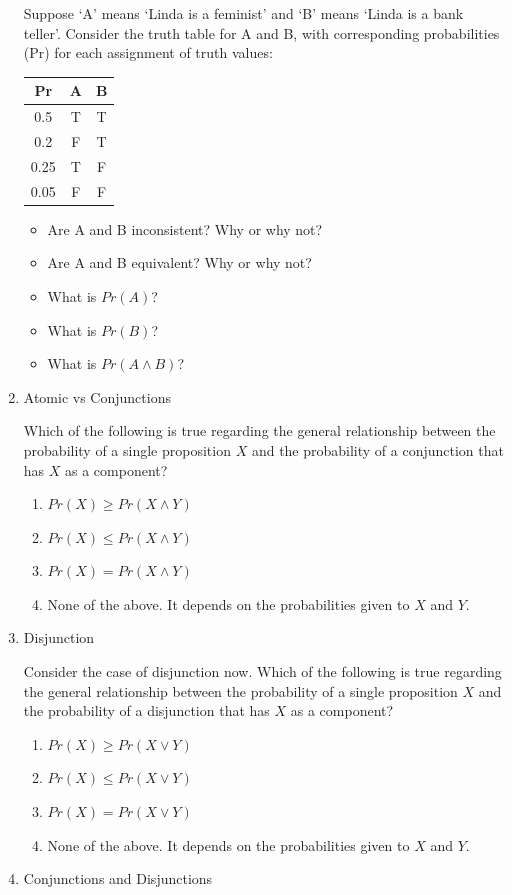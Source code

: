 \documentclass[]{tufte-book}
\providecommand{\tightlist}{%
  \setlength{\itemsep}{0pt}\setlength{\parskip}{0pt}}
\begin{document}
\begin{enumerate}
  Suppose `A' means `Linda is a feminist' and `B' means `Linda is a bank teller'. Consider the truth table for A and B, with corresponding probabilities (Pr) for each assignment of truth values:

  \begin{longtable}[]{@{}ccc@{}}
  \toprule
  Pr & A & B\tabularnewline
  \midrule
  \endhead
  0.5 & T & T\tabularnewline
  0.2 & F & T\tabularnewline
  0.25 & T & F\tabularnewline
  0.05 & F & F\tabularnewline
  \bottomrule
  \end{longtable}

  \begin{itemize}
  \tightlist
  \item
    Are A and B inconsistent? Why or why not?
  \item
    Are A and B equivalent? Why or why not?
  \item
    What is \(Pr(A)\)?
  \item
    What is \(Pr(B)\)?
  \item
    What is \(Pr(A\wedge B)\)?
  \end{itemize}
\item
  Atomic vs Conjunctions

  Which of the following is true regarding the general relationship between the probability of a single proposition \(X\) and the probability of a conjunction that has \(X\) as a component?

  \begin{enumerate}
  \def\labelenumii{\alph{enumii}.}
  \tightlist
  \item
    \(Pr(X)\geq Pr(X\wedge Y)\)
  \item
    \(Pr(X)\leq Pr(X\wedge Y)\)
  \item
    \(Pr(X) = Pr(X\wedge Y)\)
  \item
    None of the above. It depends on the probabilities given to \(X\) and \(Y\).
  \end{enumerate}
\item
  Disjunction

  Consider the case of disjunction now. Which of the following is true regarding the general relationship between the probability of a single proposition \(X\) and the probability of a disjunction that has \(X\) as a component?

  \begin{enumerate}
  \def\labelenumii{\alph{enumii}.}
  \tightlist
  \item
    \(Pr(X)\geq Pr(X\vee Y)\)
  \item
    \(Pr(X)\leq Pr(X\vee Y)\)
  \item
    \(Pr(X) = Pr(X\vee Y)\)
  \item
    None of the above. It depends on the probabilities given to \(X\) and \(Y\).
  \end{enumerate}
\item
  Conjunctions and Disjunctions


\end{enumerate}
\end{document}
